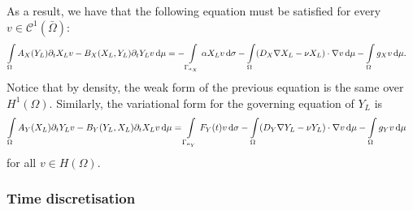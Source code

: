 \documentclass[a4paper,doc,11pt]{article}
\begin{document}
As a result, we have that the following equation must be satisfied for every $v \in \mathcal{C}^1 (\bar\Omega)$:
\begin{align}
    \int\limits_\Omega
    A_X(Y_L) \partial_t X_L v - B_X(X_L,Y_L) \partial_t Y_L v \dif \mu
    &=
    -\int\limits_{\Gamma_{a_X}}    \alpha X_L v    \dif \sigma
    -\int\limits_\Omega        (D_X \nabla X_L - \nu X_L) \cdot \nabla v  \dif \mu
    -\int\limits_\Omega        g_X v \dif \mu.
\end{align}
Notice that by density, the weak form of the previous equation is the same over $H^1(\Omega)$.
Similarly, the variational form for the governing equation of $Y_L$ is
\begin{align}
    \int\limits_\Omega
    A_Y(X_L) \partial_t Y_L v - B_Y(Y_L,X_L) \partial_t X_L v \dif \mu
    &=
    \int\limits_{\Gamma_{a_Y}}     F_Y(t) v    \dif \sigma
    -\int\limits_\Omega        (D_Y \nabla Y_L - \nu Y_L) \cdot \nabla v  \dif \mu
    -\int\limits_\Omega        g_Y v \dif \mu 
\end{align}
for all \(v \in H(\Omega)\).



\subsubsection{Time discretisation}
\end{document}
